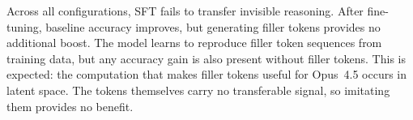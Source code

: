 \documentclass{article}
\begin{document}
Across all configurations, SFT fails to transfer invisible reasoning. After fine-tuning, baseline accuracy improves, but generating filler tokens provides no additional boost. The model learns to reproduce filler token sequences from training data, but any accuracy gain is also present without filler tokens. This is expected: the computation that makes filler tokens useful for Opus~4.5 occurs in latent space. The tokens themselves carry no transferable signal, so imitating them provides no benefit.

% 
\end{document}
